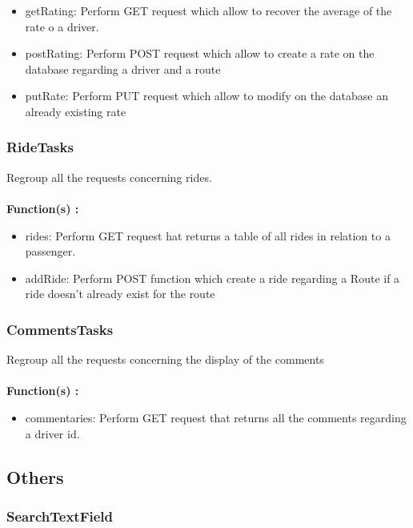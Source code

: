 \begin{itemize}
\item getRating: Perform GET request which allow to recover the average of the rate o a driver.
\item postRating: Perform POST request which allow to create a rate on the database regarding a driver and a route
\item putRate: Perform PUT request which allow to modify on the database an already existing rate 
\end{itemize}

\subsubsection{RideTasks}

Regroup all the requests concerning rides.
\\\\
\textbf{Function(s) :}

\begin{itemize}
\item rides: Perform GET request hat returns a table of all rides in relation to a passenger.
\item addRide: Perform POST function which create a ride regarding a Route if a ride doesn’t already exist for the route
\end{itemize}

\subsubsection{CommentsTasks}

Regroup all the requests concerning the display of the comments
\\\\
\textbf{Function(s) :}

\begin{itemize}
\item commentaries: Perform GET request that returns all the comments regarding a driver id.
\end{itemize}

\subsection{Others}

\subsubsection{SearchTextField}

